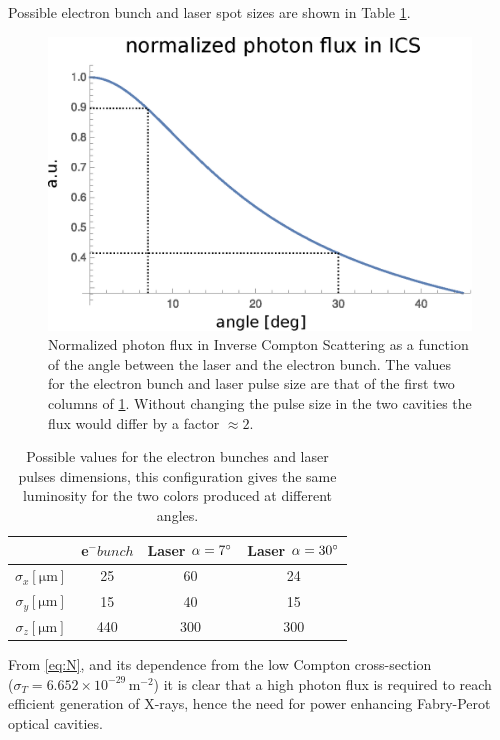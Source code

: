 Possible electron bunch and laser spot sizes are shown in Table \ref{tab:size}.
\begin{figure}
	\centering
	\includegraphics[width=0.9\linewidth]{images/photonflux.eps}
	\caption{Normalized photon flux in Inverse Compton Scattering as a function of the angle between the laser and the electron bunch. The values for the electron bunch and laser pulse size are that of the first two columns of \ref{tab:size}. Without changing the pulse size in the two cavities the flux would differ by a factor $\approx 2$.}
	\label{fig:photonflux}
\end{figure}
\begin{table}
	\centering
\begin{tabular}{|c|c|c|c|}
	\hline 
	&e$^- bunch$  &Laser $\alpha=7\degree$  &Laser $\alpha=30\degree$  \\ 
	\hline 
$\sigma_x [\mathrm{\mu m}] $	& 25 & 60 & 24 \\ 
	\hline 
$\sigma_y [\mathrm{\mu m}]$	& 15 & 40 & 15 \\ 
	\hline 
$\sigma_z [\mathrm{\mu m}]$  & 440 & 300 & 300 \\
	\hline

\end{tabular}
	\caption{Possible values for the electron bunches and laser pulses dimensions, this configuration gives the same luminosity for the two colors produced at different angles.}
\label{tab:size}
\end{table}

From \ref{eq:N}, and its dependence from the low Compton cross-section\\ ($\sigma_T=6.652\times 10^{-29}$\,m$^{-2}$) it is clear that a high photon flux is required to reach efficient generation of X-rays, hence the need for power enhancing Fabry-Perot optical cavities.

